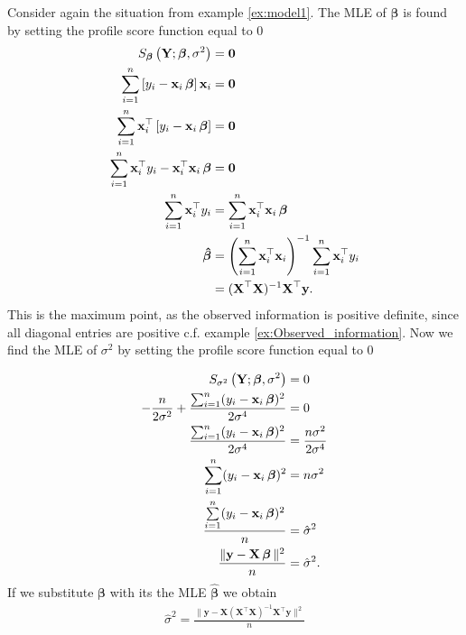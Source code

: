 \begin{example}
Consider again the situation from example \ref{ex:model1}. The MLE of $\boldsymbol{\beta}$ is found by setting the profile score function equal to $0$
\begin{align*}
    S_{\boldsymbol{\beta}}\left(\textbf{Y}; \boldsymbol{\beta}, \sigma^2 \right) &= \mathbf{0} \\
    \sum_{i=1}^n \left[ y_i - \textbf{x}_i \operatorname{\boldsymbol{\beta}} \right] \textbf{x}_i &= \mathbf{0} \\
    \sum_{i=1}^n \textbf{x}_i^\top \left[ y_i - \textbf{x}_i \operatorname{\boldsymbol{\beta}} \right] &= \mathbf{0} \\
    \sum_{i=1}^n  \textbf{x}_i^\top y_i - \textbf{x}_i^\top \textbf{x}_i \operatorname{\boldsymbol{\beta}} &= \mathbf{0} \\
    \sum_{i=1}^n  \textbf{x}_i^\top y_i &= \sum_{i=1}^n \textbf{x}_i^\top \textbf{x}_i \operatorname{\boldsymbol{\beta}} \\
    \operatorname{\boldsymbol{\hat{\beta}}} &= \left( \sum_{i=1}^n \textbf{x}_i^\top \textbf{x}_i \right)^{-1} \sum_{i=1}^n  \textbf{x}_i^\top y_i \\
    &= (\textbf{X}^\top\textbf{X})^{-1}\textbf{X}^\top \textbf{y}.
\end{align*}
This is the maximum point, as the observed information is positive definite, since all diagonal entries are positive c.f. example  \ref{ex:Observed_information}.
Now we find the MLE of $\sigma^2$ by setting the profile score function equal to $0$

\begin{align*}
     S_{\sigma^2}\left(\textbf{Y}; \boldsymbol{\beta}, \sigma^2 \right) &= 0 \\
      - \dfrac{n}{2 \sigma^2} + \dfrac{\sum_{i=1}^n (y_i -  \textbf{x}_i \operatorname{\boldsymbol{\beta}})^2}{2 \sigma^4} &= 0 \\
      \dfrac{\sum_{i=1}^n (y_i - \textbf{x}_i \operatorname{\boldsymbol{\beta}})^2}{2 \sigma^4} &= \dfrac{n\sigma^2}{2 \sigma^4} \\
      \sum_{i=1}^n (y_i - \textbf{x}_i \operatorname{\boldsymbol{\beta}})^2 &= n\sigma^2 \\
      \dfrac{\sum\limits_{i=1}^{n} (y_i - \textbf{x}_i \operatorname{\boldsymbol{\beta}})^2}{n} &= \hat{\sigma}^2 \\
      \frac{\| \textbf{y} - \textbf{X}\operatorname{\boldsymbol{\beta}}\|^2}{n} &= \hat{\sigma}^2.
\end{align*}
If we substitute $\boldsymbol{\beta}$ with its the MLE $\hat{\boldsymbol{\beta}}$ we obtain
\begin{align}\label{eq:MLE_for_sigma}
     \hat{\sigma}^2 = \frac{\| \textbf{y} - \textbf{X}(\textbf{X}^\top\textbf{X})^{-1}\textbf{X}^\top \textbf{y}\|^2}{n}
\end{align}



\end{example}
